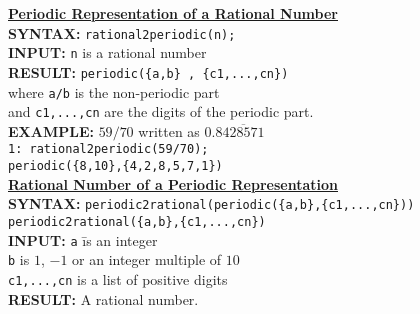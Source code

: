 \begin{tabbing}
\textbf{\underline{Periodic Representation of a Rational Number}}\\[\baselineskip]


\textbf{SYNTAX:} \hspace{3mm} 
     \= \texttt{rational2periodic(n);}\\[\baselineskip]

\textbf{INPUT:}  
     \> \texttt{n} \hspace{3mm} is a rational number\\[\baselineskip]

\textbf{RESULT:}
     \> \texttt{periodic(\{a,b\} , \{c1,...,cn\})} \\[\baselineskip]
     \> where  \texttt{a/b} is the non-periodic part\\
     \> and \texttt{c1,...,cn} are the digits of the periodic part.\\[\baselineskip]


\textbf{EXAMPLE:}
    \> $59/70$ written as $0.8\overline{428571}$\\
    \>  \texttt{1: rational2periodic(59/70);}\\[\baselineskip]
    \> \texttt{periodic(\{8,10\},\{4,2,8,5,7,1\})}\\[\baselineskip]


\textbf{\underline{Rational Number of a Periodic Representation}}\\[\baselineskip]


\textbf{SYNTAX:}
     \> \texttt{periodic2rational(periodic(\{a,b\},\{c1,...,cn\}))}\\
     \> \texttt{periodic2rational(\{a,b\},\{c1,...,cn\})}\\[\baselineskip]


\textbf{INPUT:}
     \> \hspace{15mm} \texttt{a} \hspace{3mm}\= is an integer\\
     \> \hspace{15mm} \texttt{b}             \> is $1$, $-1$ or an 
                                             integer multiple of $10$\\
     \> \texttt{c1,...,cn}               \> is a list of positive digits\\[\baselineskip]

\textbf{RESULT:}
     \> A rational number.\\[\baselineskip]


\end{tabbing}
